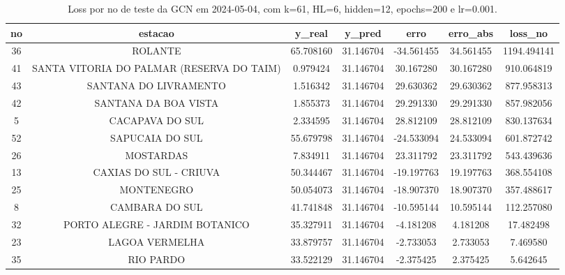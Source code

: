 \begin{table}[h]
\centering
\caption{Loss por no de teste da GCN em 2024-05-04, com k=61, HL=6, hidden=12, epochs=200 e lr=0.001.}
\label{tab:gcn_loss_k61_hl6_h12_e200_d20240504}
\begin{tabular}{ccccccc}
\toprule
no & estacao & y\_real & y\_pred & erro & erro\_abs & loss\_no \\
\midrule
36 & ROLANTE & 65.708160 & 31.146704 & -34.561455 & 34.561455 & 1194.494141 \\
41 & SANTA VITORIA DO PALMAR (RESERVA DO TAIM) & 0.979424 & 31.146704 & 30.167280 & 30.167280 & 910.064819 \\
43 & SANTANA DO LIVRAMENTO & 1.516342 & 31.146704 & 29.630362 & 29.630362 & 877.958313 \\
42 & SANTANA DA BOA VISTA & 1.855373 & 31.146704 & 29.291330 & 29.291330 & 857.982056 \\
5 & CACAPAVA DO SUL & 2.334595 & 31.146704 & 28.812109 & 28.812109 & 830.137634 \\
52 & SAPUCAIA DO SUL & 55.679798 & 31.146704 & -24.533094 & 24.533094 & 601.872742 \\
26 & MOSTARDAS & 7.834911 & 31.146704 & 23.311792 & 23.311792 & 543.439636 \\
13 & CAXIAS DO SUL - CRIUVA & 50.344467 & 31.146704 & -19.197763 & 19.197763 & 368.554108 \\
25 & MONTENEGRO & 50.054073 & 31.146704 & -18.907370 & 18.907370 & 357.488617 \\
8 & CAMBARA DO SUL & 41.741848 & 31.146704 & -10.595144 & 10.595144 & 112.257080 \\
32 & PORTO ALEGRE - JARDIM BOTANICO & 35.327911 & 31.146704 & -4.181208 & 4.181208 & 17.482498 \\
23 & LAGOA VERMELHA & 33.879757 & 31.146704 & -2.733053 & 2.733053 & 7.469580 \\
35 & RIO PARDO & 33.522129 & 31.146704 & -2.375425 & 2.375425 & 5.642645 \\
\bottomrule
\end{tabular}
\end{table}
